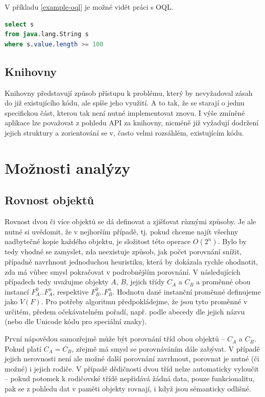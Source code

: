 V příkladu \ref{example-oql} je možné vidět práci s OQL.

\begin{lstlisting}[caption={Příklad OQL}, label={example-oql}, frame={single}, language={SQL}]
select s 
from java.lang.String s 
where s.value.length >= 100
\end{lstlisting}

\section{Knihovny}
Knihovny představují způsob přístupu k problému, který by nevyžadoval zásah do již existujícího kódu, ale spíše jeho využití. A to tak, že se starají o jednu specifickou část, kterou tak není nutné implementovat znovu. I výše zmíněné aplikace lze považovat z pohledu API za knihovny, nicméně již vyžadují dodržení jejich struktury a zorientování se v, často velmi rozsáhlém, existujícím kódu.




\chapter{Možnosti analýzy}

\section{Rovnost objektů}
Rovnost dvou či více objektů se dá definovat a zjišťovat různými způsoby. Je ale nutné si uvědomit, že v nejhorším případě, tj. pokud chceme najít všechny nadbytečné kopie každého objektu, je složitost této operace $O(2^n)$. Bylo by tedy vhodné se zamyslet, zda neexistuje způsob, jak počet porovnání snížit, případně navrhnout jednoduchou heuristiku, která by dokázala rychle ohodnotit, zda má vůbec smysl pokračovat v podrobnějším porovnání. V následujících případech tedy uvažujme objekty $A$, $B$, jejich třídy $C_A$ a $C_B$ a proměnné obou instancí $F_A^0..F_A^n$, respektive $F_B^0..F_B^n$. Hodnotu dané instanční proměnné definujeme jako $V(F)$. Pro potřeby algoritmu předpokládejme, že jsou tyto proměnné v určitém, předem očekávatelném pořadí, např. podle abecedy dle jejich názvu (nebo dle Unicode kódu pro speciální znaky).

První nápovědou samozřejmě může být porovnání tříd obou objektů -- $C_A$ a $C_B$. Pokud platí $C_A = C_B$, zřejmě má smysl se porovnáváním dále zabývat. V případě jejich nerovnosti není ale možné další porovnání zavrhnout, porovnat je nutné (či možné) i jejich rodiče. V případě dědičnosti dvou tříd nelze automaticky vyloučit -- pokud potomek k rodičovské třídě nepřidává žádná data, pouze funkcionalitu, pak se z pohledu dat v paměti objekty rovnají, i když jsou sémanticky odlišné.

